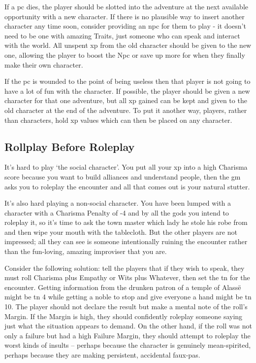\begin{multicols}{2}
If a \gls{pc} dies, the player should be slotted into the adventure at the next available opportunity with a new character.
If there is no plausible way to insert another character any time soon, consider providing an \gls{npc} for them to play - it doesn't need to be one with amazing Traits, just someone who can speak and interact with the world.
All unspent \gls{xp} from the old character should be given to the new one, allowing the player to boost the N\gls{pc} or save up more for when they finally make their own character.

If the \gls{pc} is wounded to the point of being useless then that player is not going to have a lot of fun with the character.
If possible, the player should be given a new character for that one adventure, but all \gls{xp} gained can be kept and given to the old character at the end of the adventure.
To put it another way, players, rather than characters, hold \gls{xp} values which can then be placed on any character.

\subsection{Rollplay Before Roleplay}

It's hard to play `the social character'.
You put all your \gls{xp} into a high Charisma score because you want to build alliances and understand people, then the \gls{gm} asks you to roleplay the encounter and all that comes out is your natural stutter.

It's also hard playing a non-social character.
You have been lumped with a character with a Charisma Penalty of -4 and by all the gods you intend to roleplay it, so it's time to ask the town master which lady he stole his robe from and then wipe your mouth with the tablecloth.
But the other players are not impressed; all they can see is someone intentionally ruining the encounter rather than the fun-loving, amazing improviser that you are.

Consider the following solution: tell the players that if they wish to speak, they must roll Charisma plus Empathy or Wits plus Whatever, then set the \gls{tn} for the encounter.
Getting information from the drunken patron of a temple of Alass\"{e} might be \gls{tn} 4 while getting a noble to stop and give everyone a hand might be \gls{tn} 10.
The player should not declare the result but make a mental note of the roll's Margin.
If the Margin is high, they should confidently roleplay someone saying just what the situation appears to demand.
On the other hand, if the roll was not only a failure but had a high Failure Margin, they should attempt to roleplay the worst kinds of insults -- perhaps because the character is genuinely mean-spirited, perhaps because they are making persistent, accidental faux-pas.


\end{multicols}
